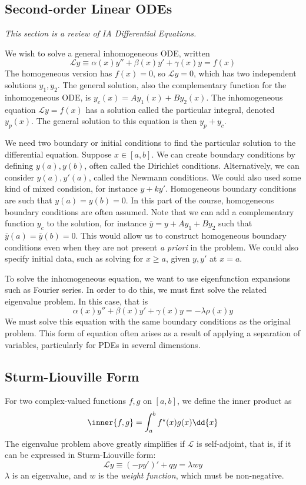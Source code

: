 \subsection{Second-order Linear ODEs}
\textit{This section is a review of IA Differential Equations.}

\noindent We wish to solve a general inhomogeneous ODE, written
\[ \mathcal L y \equiv \alpha(x) y'' + \beta(x) y' + \gamma(x) y = f(x) \]
The homogeneous version has \( f(x) = 0 \), so \( \mathcal L y = 0 \), which has two independent solutions \( y_1, y_2 \).
The general solution, also the complementary function for the inhomogeneous ODE, is \( y_c(x) = A y_1(x) + B y_2(x) \).
The inhomogeneous equation \( \mathcal L y = f(x) \) has a solution called the particular integral, denoted \( y_p(x) \).
The general solution to this equation is then \( y_p + y_c \).

We need two boundary or initial conditions to find the particular solution to the differential equation.
Suppose \( x \in [a,b] \).
We can create boundary conditions by defining \( y(a), y(b) \), often called the Dirichlet conditions.
Alternatively, we can consider \( y(a), y'(a) \), called the Newmann conditions.
We could also used some kind of mixed condision, for instance \( y + ky' \).
Homogeneous boundary conditions are such that \( y(a) = y(b) = 0 \).
In this part of the course, homogeneous boundary conditions are often assumed.
Note that we can add a complementary function \( y_c \) to the solution, for instance \( \overline{y} = y + A y_1 + B y_2 \) such that \( \overline{y}(a) = \overline{y}(b) = 0 \).
This would allow us to construct homogeneous boundary conditions even when they are not present \textit{a priori} in the problem.
We could also specify initial data, such as solving for \( x \geq a \), given \( y, y' \) at \( x = a \).

To solve the inhomogeneous equation, we want to use eigenfunction expansions such as Fourier series.
In order to do this, we must first solve the related eigenvalue problem.
In this case, that is
\[ \alpha(x) y'' + \beta(x) y' + \gamma(x) y = -\lambda \rho(x) y \]
We must solve this equation with the same boundary conditions as the original problem.
This form of equation often arises as a result of applying a separation of variables, particularly for PDEs in several dimensions.

\subsection{Sturm-Liouville Form}
For two complex-valued functions \( f, g \) on \( [a,b] \), we define the inner product as
\[ \inner{f,g} = \int_a^b f^\star(x) g(x) \dd{x} \]
The eigenvalue problem above greatly simplifies if \( \mathcal L \) is self-adjoint, that is, if it can be expressed in Sturm-Liouville form:
\[ \mathcal L y \equiv (-py')' + qy = \lambda w y \]
\( \lambda \) is an eigenvalue, and \( w \) is the \textit{weight function}, which must be non-negative.


